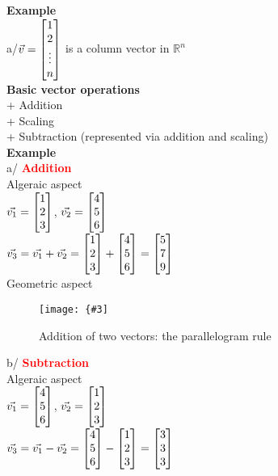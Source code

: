 \documentclass[12pt,a4paper]{article}
\newcommand{\img}[3]{
	\texttt{[image: \{\#3]}}}
\newcommand{\red}[1]{\textcolor{red}{\textbf{#1}}}
\begin{document}
\noindent\textbf{Example}\\
a/$\vec{v}=\mqty[1\\ 2\\ \vdots\\ n]$ is a column vector in $\mathbb{R}^{n}$\\

\noindent\textbf{Basic vector operations}\\
+ Addition\\
+ Scaling\\
+ Subtraction (represented via addition and scaling)\\

\noindent\textbf{Example}\\
a/ \red{Addition}\\
Algeraic aspect\\
$\vec{v_1}=\mqty[1\\ 2\\ 3]$, $\vec{v_2}=\mqty[4\\ 5\\ 6]$\\
$\vec{v_3}=\vec{v_1}+\vec{v_2}=\mqty[1\\ 2\\ 3]+\mqty[4\\ 5\\ 6]=\mqty[5\\ 7\\ 9]$\\

\noindent Geometric aspect\\
\begin{figure}[h!]
\centering\img{10cm}{4cm}{Picture/Linear_algebra/Vector_and_basic_ops/1.png}
\caption{Addition of two vectors: the parallelogram rule}
\end{figure}

\noindent b/ \red{Subtraction}\\
Algeraic aspect\\
$\vec{v_1}=\mqty[4\\ 5\\ 6]$, $\vec{v_2}=\mqty[1\\ 2\\ 3]$\\
$\vec{v_3}=\vec{v_1}-\vec{v_2}=\mqty[4\\ 5\\ 6]-\mqty[1\\ 2\\ 3]=\mqty[3\\ 3\\ 3]$\\
\end{document}
